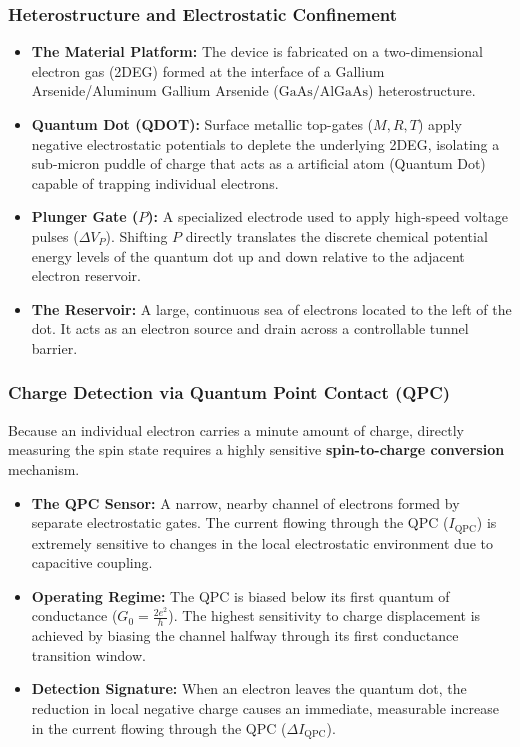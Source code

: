 \documentclass[
]{article}
\providecommand{\tightlist}{%
  \setlength{\itemsep}{0pt}\setlength{\parskip}{0pt}}
\begin{document}
\subsubsection{Heterostructure and Electrostatic
Confinement}\label{heterostructure-and-electrostatic-confinement}

\begin{itemize}
\tightlist
\item
  \textbf{The Material Platform:} The device is fabricated on a
  two-dimensional electron gas (2DEG) formed at the interface of a
  Gallium Arsenide/Aluminum Gallium Arsenide (\(\text{GaAs/AlGaAs}\))
  heterostructure.
\item
  \textbf{Quantum Dot (QDOT):} Surface metallic top-gates (\(M, R, T\))
  apply negative electrostatic potentials to deplete the underlying
  2DEG, isolating a sub-micron puddle of charge that acts as a
  artificial atom (Quantum Dot) capable of trapping individual
  electrons.
\item
  \textbf{Plunger Gate (\(P\)):} A specialized electrode used to apply
  high-speed voltage pulses (\(\Delta V_P\)). Shifting \(P\) directly
  translates the discrete chemical potential energy levels of the
  quantum dot up and down relative to the adjacent electron reservoir.
\item
  \textbf{The Reservoir:} A large, continuous sea of electrons located
  to the left of the dot. It acts as an electron source and drain across
  a controllable tunnel barrier.
\end{itemize}

\subsubsection{Charge Detection via Quantum Point Contact
(QPC)}\label{charge-detection-via-quantum-point-contact-qpc}

Because an individual electron carries a minute amount of charge,
directly measuring the spin state requires a highly sensitive
\textbf{spin-to-charge conversion} mechanism.

\begin{itemize}
\tightlist
\item
  \textbf{The QPC Sensor:} A narrow, nearby channel of electrons formed
  by separate electrostatic gates. The current flowing through the QPC
  (\(I_{\text{QPC}}\)) is extremely sensitive to changes in the local
  electrostatic environment due to capacitive coupling.
\item
  \textbf{Operating Regime:} The QPC is biased below its first quantum
  of conductance (\(G_0 = \frac{2e^2}{h}\)). The highest sensitivity to
  charge displacement is achieved by biasing the channel halfway through
  its first conductance transition window.
\item
  \textbf{Detection Signature:} When an electron leaves the quantum dot,
  the reduction in local negative charge causes an immediate, measurable
  increase in the current flowing through the QPC
  (\(\Delta I_{\text{QPC}}\)).
\end{itemize}
\end{document}
